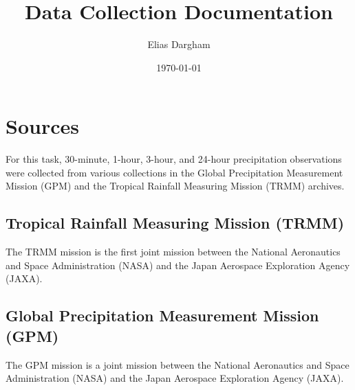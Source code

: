 \documentclass[
  12pt,
  a4paper,
]{article}
\author{Elias Dargham}
\title{Data Collection Documentation}
\date{\today}
\begin{document}
\maketitle




\section{Sources}
For this task, 30-minute, 1-hour, 3-hour, and 24-hour precipitation observations were collected from various collections in the Global Precipitation Measurement Mission (GPM) and the Tropical Rainfall Measuring Mission (TRMM) archives.

\subsection*{Tropical Rainfall Measuring Mission (TRMM)}
The TRMM mission is the first joint mission between the National Aeronautics and Space Administration (NASA) and the Japan Aerospace Exploration Agency (JAXA).

\subsection*{Global Precipitation Measurement Mission (GPM)}
The GPM mission is a joint mission between the National Aeronautics and Space Administration (NASA) and the Japan Aerospace Exploration Agency (JAXA).



\end{document}

